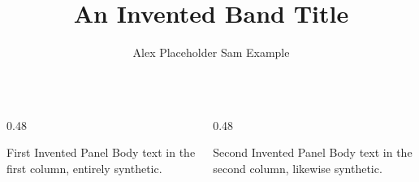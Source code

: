 \documentclass{poster}
\title{An Invented Band Title}
\author{Alex Placeholder \quad Sam Example}
\institute{An Invented Institute}
\begin{document}
\begin{frame}
\begin{columns}
\begin{column}{0.48\textwidth}
\begin{block}{First Invented Panel}
Body text in the first column, entirely synthetic.
\end{block}
\end{column}
\begin{column}{0.48\textwidth}
\begin{alertblock}{Second Invented Panel}
Body text in the second column, likewise synthetic.
\end{alertblock}
\end{column}
\end{columns}
\end{frame}
\end{document}
